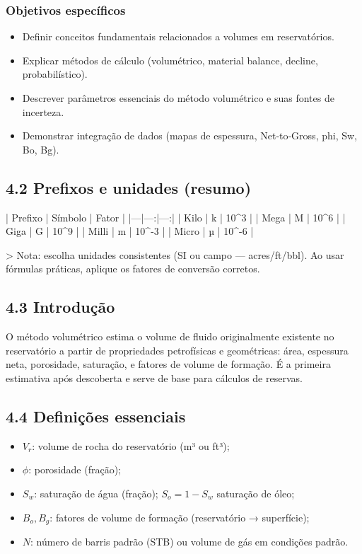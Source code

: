 \documentclass[11pt,a4paper]{article}
\begin{document}
\subsubsection{Objetivos específicos}
\begin{itemize}
\item Definir conceitos fundamentais relacionados a volumes em reservatórios.
\item Explicar métodos de cálculo (volumétrico, material balance, decline, probabilístico).
\item Descrever parâmetros essenciais do método volumétrico e suas fontes de incerteza.
\item Demonstrar integração de dados (mapas de espessura, Net‑to‑Gross, phi, Sw, Bo, Bg).
\end{itemize}

\subsection{4.2 Prefixos e unidades (resumo)}
| Prefixo | Símbolo | Fator |
|---|---:|---:|
| Kilo | k | 10^3 |
| Mega | M | 10^6 |
| Giga | G | 10^9 |
| Milli | m | 10^-3 |
| Micro | µ | 10^-6 |

> Nota: escolha unidades consistentes (SI ou campo — acres/ft/bbl). Ao usar fórmulas práticas, aplique os fatores de conversão corretos.

\subsection{4.3 Introdução}
O método volumétrico estima o volume de fluido originalmente existente no reservatório a partir de propriedades petrofísicas e geométricas: área, espessura neta, porosidade, saturação, e fatores de volume de formação. É a primeira estimativa após descoberta e serve de base para cálculos de reservas.

\subsection{4.4 Definições essenciais}
\begin{itemize}
\item $V_r$: volume de rocha do reservatório (m³ ou ft³);
\item $\phi$: porosidade (fração);
\item $S_w$: saturação de água (fração); $S_o=1-S_w$ saturação de óleo;
\item $B_o, B_g$: fatores de volume de formação (reservatório → superfície);
\item $N$: número de barris padrão (STB) ou volume de gás em condições padrão.
\end{itemize}
\end{document}
